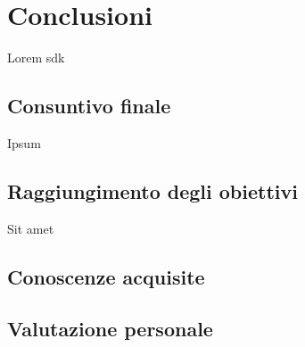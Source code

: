 \chapter{Conclusioni}
\label{cap:conclusioni}
Lorem \gls{sdk}

\section{Consuntivo finale}

Ipsum

\section{Raggiungimento degli obiettivi}

Sit amet


\section{Conoscenze acquisite}

\section{Valutazione personale}
